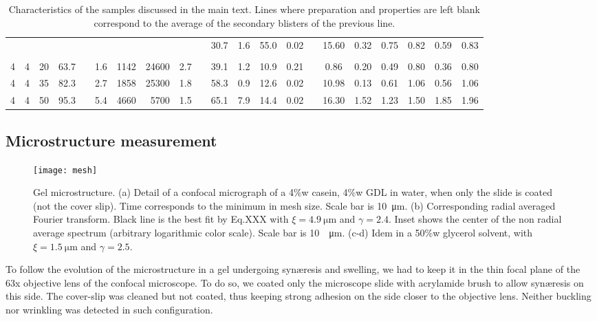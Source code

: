 \documentclass[twocolumn,superscriptaddress,showpacs,preprintnumbers,
amsmath,amssymb,prl]{revtex4-1}
\begin{document}
\begin{table*}
\begin{tabular}{SSSScSrrScSSSScSSSSSS}
& & & && & & & && 30.7 & 1.6 & 55.0 & 0.02 && 15.60 & 0.32 & 0.75 & 0.82 & 0.59 & 0.83 \\
   \\[-2ex]
4 & 4 & 20 & 63.7 && 1.6 & 1142 & 24600 & 2.7 && 39.1 & 1.2 & 10.9 & 0.21 && 0.86 & 0.20 & 0.49 & 0.80 & 0.36 & 0.80 \\ 
4 & 4 & 35 & 82.3 && 2.7 & 1858 & 25300 & 1.8 && 58.3 & 0.9 & 12.6 & 0.02 && 10.98 & 0.13 & 0.61 & 1.06 & 0.56 & 1.06 \\ 
4 & 4 & 50 & 95.3 && 5.4 & 4660 & 5700 & 1.5 && 65.1 & 7.9 & 14.4 & 0.02 && 16.30 & 1.52 & 1.23 & 1.50 & 1.85 & 1.96 \\ 
\end{tabular}
\caption{Characteristics of the samples discussed in the main text. Lines where preparation and properties are left blank correspond to the average of the secondary blisters of the previous line.}
\label{tab:data}
\end{table*}

\subsection*{Microstructure measurement}

\begin{figure}
	\texttt{[image: mesh]}
	\caption{Gel microstructure. (a) Detail of a confocal micrograph of a 4\%w casein, 4\%w GDL in water, when only the slide is coated (not the cover slip). Time corresponds to the minimum in mesh size. Scale bar is \SI{10}{\micro\metre}. (b) Corresponding radial averaged Fourier transform. Black line is the best fit by Eq.XXX with $\xi=\SI{4.9}{\micro\metre}$ and $\gamma=2.4$. Inset shows the center of the non radial average spectrum (arbitrary logarithmic color scale). Scale bar is \SI{10}{\per\micro\metre}. (c-d) Idem in a 50\%w glycerol solvent, with $\xi=\SI{1.5}{\micro\metre}$ and $\gamma=2.5$.}
	\label{fig:mesh}
\end{figure}

To follow the evolution of the microstructure in a gel undergoing syn\ae{}resis and swelling, we had to keep it in the thin focal plane of the 63x objective lens of the confocal microscope. To do so, we coated only the microscope slide with acrylamide brush to allow syn\ae{}resis on this side. The cover-slip was cleaned but not coated, thus keeping strong adhesion on the side closer to the objective lens. Neither buckling nor wrinkling was detected in such configuration.
\end{document}

